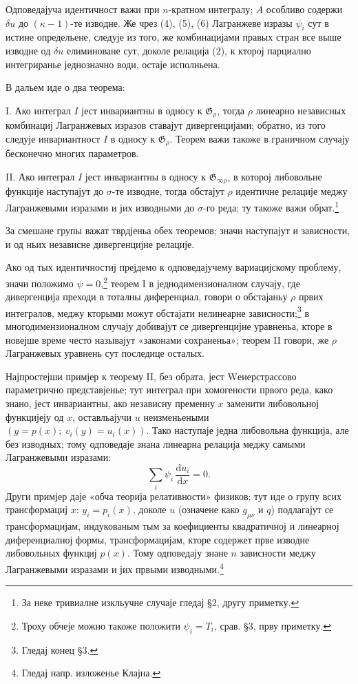 ﻿\documentclass[11pt]{article}
\providecommand{\G}{\mathfrak G}
\providecommand{\dd}{\mathrm d}
\begin{document}
Одповедајуча идентичност важи при \(n\)-кратном интегралу; \(A\) особливо содержи \(\delta u\) до \((\kappa-1)\)-те изводне. Же чрез (4), (5), (6) Лагранжеве изразы \(\psi_i\) сут в истине определьене, следује из того, же комбинацијами правых стран все выше изводне од \(\delta u\) елиминоване сут, доколе релација (2), к кторој парциално интегриранье једнозначно води, остаје исполньена.

В дальем иде о два теорема:

I. Ако интеграл \(I\) јест инвариантны в односу к \(\G_\rho\), тогда \(\rho\) линеарно независных комбинациј Лагранжевых изразов ставајут дивергенцијами; обратно, из того следује инвариантност \(I\) в односу к \(\G_\rho\). Теорем важи такоже в граничном случају бесконечно многих параметров.

II. Ако интеграл \(I\) јест инвариантны в односу к \(\G_{\infty\rho}\), в которој либовольне функције наступајут до \(\sigma\)-те изводне, тогда обстајут \(\rho\) идентичне релације меджу Лагранжевыми изразами и јих изводными до \(\sigma\)-го реда; ту такоже важи обрат.\footnote{За неке тривиалне изкльучне случаје гледај \S{}2, другу приметку.}

За смешане групы важат тврдјеньа обех теоремов; значи наступајут и зависности, и од ньих независне дивергенцијне релације.

Ако од тых идентичностиј прејдемо к одповедајучему вариацијскому проблему, значи положимо \(\psi=0\),\footnote{Троху обчеје можно такоже положити \(\psi_i=T_i\), срав. \S{}3, прву приметку.} теорем I в једнодимензионалном случају, где дивергенција преходи в тоталны диференциал, говори о обстајаньу \(\rho\) првих интегралов, меджу кторыми можут обстајати нелинеарне зависности;\footnote{Гледај конец \S{}3.} в многодимензионалном случају добивајут се дивергенцијне уравненьа, кторе в новејше време често называјут «законами сохраненьа»; теорем II говори, же \(\rho\) Лагранжевых уравнень сут последице осталых.

Најпростејши примјер к теорему II, без обрата, јест Wеиерстрассово параметрично представјенье; тут интеграл при хомогености првого реда, како знано, јест инвариантны, ако независну пременну \(x\) заменити либовольној функцијеју од \(x\), оставльајучи \(u\) неизменьеными \((y=p(x);\ v_i(y)=u_i(x))\). Тако наступаје једна либовольна функција, але без изводных; тому одповедаје знана линеарна релација меджу самыми Лагранжевыми изразами:
\[
\sum_i \psi_i\,\frac{\dd u_i}{\dd x}=0.
\]
Други примјер даје «обча теорија релативности» физиков; тут иде о групу всих трансформациј \(x\): \(y_i=p_i(x)\), доколе \(u\) (означене како \(g_{\mu\nu}\) и \(q\)) подлагајут се трансформацијам, индукованым тым за коефициенты квадратичној и линеарној диференциалној формы, трансформацијам, кторе содержет прве изводне либовольных функциј \(p(x)\). Тому одповедају знане \(n\) зависности меджу Лагранжевыми изразами и јих првыми изводными.\footnote{Гледај напр. изложенье Клајна.}
\end{document}
